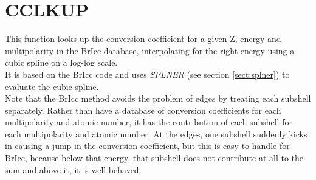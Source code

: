 \section{CCLKUP}
\label{sect:cclkup}

\noindent This function looks up the conversion coefficient for a
given Z, energy and multipolarity in the BrIcc database, interpolating
for the right energy using a cubic spline on a log-log scale.\\

\noindent It is based on the BrIcc code and uses {\em SPLNER} (see
section \ref{sect:splner}) to evaluate the cubic spline.\\

\noindent Note that the BrIcc method avoids the problem of edges by
treating each subshell separately. Rather than have a database of
conversion coefficients for each multipolarity and atomic number, it
has the contribution of each subshell for each multipolarity and
atomic number. At the edges, one subshell suddenly kicks in causing a
jump in the conversion coefficient, but this is easy to handle for
BrIcc, because below that energy, that subshell does not contribute at
all to the sum and above it, it is well behaved.\\

